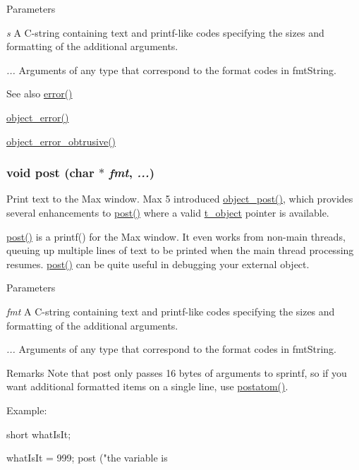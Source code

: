 \begin{DoxyParams}{Parameters}
\item[{\em s}]A C-\/string containing text and printf-\/like codes specifying the sizes and formatting of the additional arguments. \item[{\em ...}]Arguments of any type that correspond to the format codes in fmtString.\end{DoxyParams}
\begin{DoxySeeAlso}{See also}
\hyperlink{group__console_gaa7733e30b2951f225e24dca1ed4632b2}{error()} 

\hyperlink{group__console_ga05f7fed66fafc6e4d2e372b7f0fe4e43}{object\_\-error()} 

\hyperlink{group__console_ga42a612b12b1a24380a45ab1b9278b950}{object\_\-error\_\-obtrusive()} 
\end{DoxySeeAlso}
\hypertarget{group__console_ga3714108f42b44384b4d58009eafc1806}{
\subsubsection[{post}]{\setlength{\rightskip}{0pt plus 5cm}void post (char $\ast$ {\em fmt}, \/   {\em ...})}}
\label{group__console_ga3714108f42b44384b4d58009eafc1806}


Print text to the Max window. Max 5 introduced \hyperlink{group__console_gafb92b17363269d4d26de1823cbc2492d}{object\_\-post()}, which provides several enhancements to \hyperlink{group__console_ga3714108f42b44384b4d58009eafc1806}{post()} where a valid \hyperlink{structt__object}{t\_\-object} pointer is available.

\hyperlink{group__console_ga3714108f42b44384b4d58009eafc1806}{post()} is a printf() for the Max window. It even works from non-\/main threads, queuing up multiple lines of text to be printed when the main thread processing resumes. \hyperlink{group__console_ga3714108f42b44384b4d58009eafc1806}{post()} can be quite useful in debugging your external object.


\begin{DoxyParams}{Parameters}
\item[{\em fmt}]A C-\/string containing text and printf-\/like codes specifying the sizes and formatting of the additional arguments. \item[{\em ...}]Arguments of any type that correspond to the format codes in fmtString.\end{DoxyParams}
\begin{DoxyRemark}{Remarks}
Note that post only passes 16 bytes of arguments to sprintf, so if you want additional formatted items on a single line, use \hyperlink{group__console_gaef84325d992e0afa14b2e7b0c0515601}{postatom()}.
\end{DoxyRemark}
Example: 
\begin{DoxyCode}
    short whatIsIt; 

    whatIsIt = 999; 
    post ("the variable is %
\end{DoxyCode}


